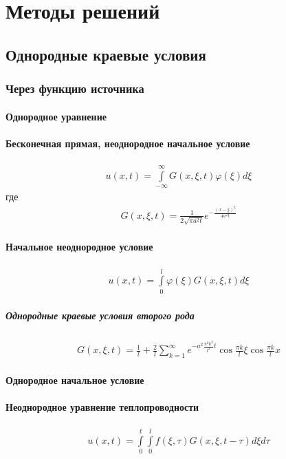 \documentclass{article}[12pt]
\begin{document}
\section{Методы решений}
\subsection{Однородные краевые условия}
\subsubsection{Через функцию источника}
\paragraph{Однородное уравнение}
\paragraph{Бесконечная прямая, неоднородное начальное условие}
\begin{eqnarray*}
    u(x,t)=\int\limits_{-\infty}^{\infty}G(x,\xi,t)\varphi(\xi)d\xi
\end{eqnarray*}
где
\begin{eqnarray*}
    G(x,\xi,t)
    =\frac{1}{2\sqrt{\pi a^{2}t}}e^{-\frac{(x-\xi)^{2}}{4a^{2}t}}
\end{eqnarray*}

\paragraph{Начальное неоднородное условие}
\begin{eqnarray*}
    u(x,t)=\int\limits_{0}^{l}\varphi(\xi)G(x,\xi,t)d\xi
\end{eqnarray*}
\subparagraph{Однородные краевые условия второго рода}
\begin{eqnarray*}
    G(x,\xi,t)=\frac{1}{l}+\frac{2}{l}\sum\limits_{k=1}^{\infty}
    e^{-a^{2}\frac{\pi^{2}k^{2}}{l^{2}}t}
    \cos{\frac{\pi k}{l}\xi}\cos{\frac{\pi k}{l}x}
\end{eqnarray*}

\paragraph{Однородное начальное условие}

\paragraph{Неоднородное уравнение теплопроводности}
\begin{eqnarray*}
    u(x,t)=\int\limits_{0}^{t}\int\limits_{0}^{l}
    f(\xi,\tau)G(x,\xi,t-\tau)d\xi d\tau
\end{eqnarray*}
\end{document}
